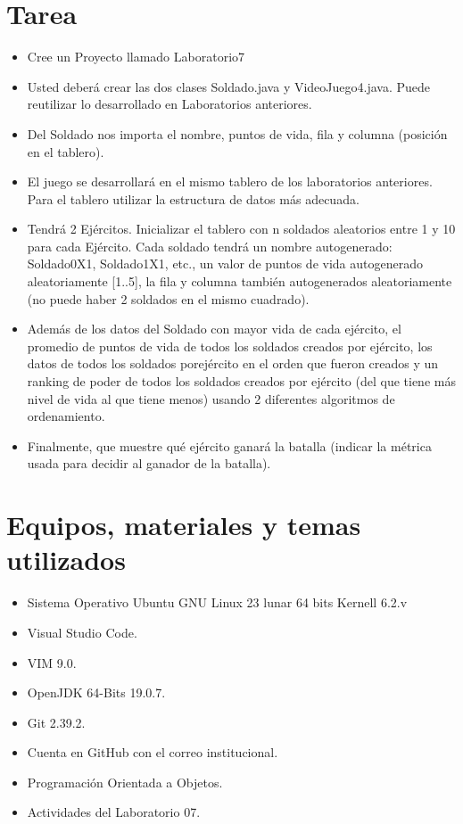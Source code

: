 \documentclass{article}
\begin{document}
	\section{Tarea}
	\begin{itemize}		
        \item Cree un Proyecto llamado Laboratorio7
		\item Usted deberá crear las dos clases Soldado.java y VideoJuego4.java. Puede reutilizar lo desarrollado en Laboratorios anteriores.
		\item Del Soldado nos importa el nombre, puntos de vida, fila y columna (posición en el tablero).
		\item El juego se desarrollará en el mismo tablero de los laboratorios anteriores. Para el tablero utilizar la estructura de datos más adecuada.
		\item Tendrá 2 Ejércitos. Inicializar el tablero con n soldados aleatorios entre 1 y 10 para cada Ejército. Cada soldado tendrá un nombre autogenerado: Soldado0X1, Soldado1X1, etc., un valor de puntos de vida autogenerado aleatoriamente [1..5], la fila y columna también autogenerados aleatoriamente (no puede haber 2 soldados en el mismo cuadrado). 
		\item Además de los datos del Soldado con mayor vida de cada ejército, el promedio de puntos de vida de todos los soldados creados por ejército, los datos de todos los soldados porejército en el orden que fueron creados y un ranking de poder de todos los soldados creados por ejército (del que tiene más nivel de vida al que tiene menos) usando 2 diferentes algoritmos de ordenamiento.
		\item Finalmente, que muestre qué ejército ganará la batalla (indicar la métrica usada para decidir al ganador de la batalla).
	\end{itemize}

	\section{Equipos, materiales y temas utilizados}
	\begin{itemize}
		\item Sistema Operativo Ubuntu GNU Linux 23 lunar 64 bits Kernell 6.2.v
		\item Visual Studio Code.
		\item VIM 9.0.
		\item OpenJDK 64-Bits 19.0.7.
		\item Git 2.39.2.
		\item Cuenta en GitHub con el correo institucional.
		\item Programación Orientada a Objetos.
		\item Actividades del Laboratorio 07.	
	\end{itemize}
	
\end{document}

